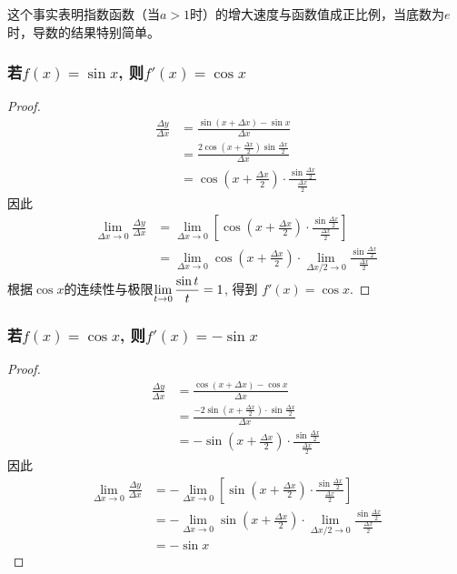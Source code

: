 这个事实表明指数函数（当$a>1$时）的增大速度与函数值成正比例，当底数为$e$时，导数的结果特别简单。


\subsubsection{若$f(x)=\sin x$, 则$f'(x)=\cos x$}
\begin{proof}
    \[\begin{split}
\frac{\Delta y}{\Delta x}&=\frac{\sin(x+\Delta x)-\sin x}{\Delta x}\\
&=\frac{2\cos\left(x+\frac{\Delta x}{2}\right)\sin\frac{\Delta x}{2}}{\Delta x}\\
&=\cos\left(x+\frac{\Delta x}{2}\right)\cdot \frac{\sin\frac{\Delta x}{2}}{\frac{\Delta x}{2}}
    \end{split}\]
因此
\[\begin{split}
    \lim_{\Delta x\to 0}\frac{\Delta y}{\Delta x}&=\lim_{\Delta x\to 0}\left[\cos\left(x+\frac{\Delta x}{2}\right)\cdot \frac{\sin\frac{\Delta x}{2}}{\frac{\Delta x}{2}}\right]\\
    &=\lim_{\Delta x\to 0}\cos\left(x+\frac{\Delta x}{2}\right)\cdot \lim_{\Delta x/2\to 0}\frac{\sin\frac{\Delta x}{2}}{\frac{\Delta x}{2}}
\end{split}\]
根据$\cos x$的连续性与极限$\displaystyle\lim_{t\to 0}\dfrac{\sin t}{t}=1$, 得到
$f' (x) =\cos x$.
\end{proof}

\subsubsection{若$f(x)=\cos x$, 则$f'(x)=-\sin x$}
\begin{proof}
\[\begin{split}
\frac{\Delta y}{\Delta x}&=\frac{\cos(x+\Delta x)-\cos x}{\Delta x}\\
&=\frac{-2\sin\left(x+\frac{\Delta x}{2}\right)\cdot \sin\frac{\Delta x}{2}}{\Delta x}\\
&=-\sin\left(x+\frac{\Delta x}{2}\right)\cdot \frac{\sin\frac{\Delta x}{2}}{\frac{\Delta x}{2}}
    \end{split}\]
因此
\[\begin{split}
    \lim_{\Delta x\to 0}\frac{\Delta y}{\Delta x}&=-\lim_{\Delta x\to 0}\left[\sin\left(x+\frac{\Delta x}{2}\right)\cdot \frac{\sin\frac{\Delta x}{2}}{\frac{\Delta x}{2}}\right]\\
    &=-\lim_{\Delta x\to 0}\sin\left(x+\frac{\Delta x}{2}\right)\cdot \lim_{\Delta x/2\to 0}\frac{\sin\frac{\Delta x}{2}}{\frac{\Delta x}{2}}\\
    &=-\sin  x
\end{split}\]
\end{proof}

